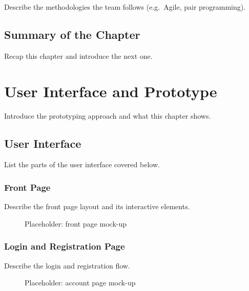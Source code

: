 \documentclass[
  12pt,
  a4paper,
]{report}
\begin{document}
Describe the methodologies the team follows (e.g.~Agile, pair
programming).

\section{Summary of the Chapter}\label{summary-of-the-chapter-2}

Recap this chapter and introduce the next one.

\chapter{User Interface and
Prototype}\label{user-interface-and-prototype}

Introduce the prototyping approach and what this chapter shows.

\section{User Interface}\label{user-interface}

List the parts of the user interface covered below.

\subsection{Front Page}\label{front-page}

Describe the front page layout and its interactive elements.

\begin{figure}
\centering
{}
\caption{Placeholder: front page mock-up}
\end{figure}

\subsection{Login and Registration
Page}\label{login-and-registration-page}

Describe the login and registration flow.

\begin{figure}
\centering
{}
\caption{Placeholder: account page mock-up}
\end{figure}
\end{document}
